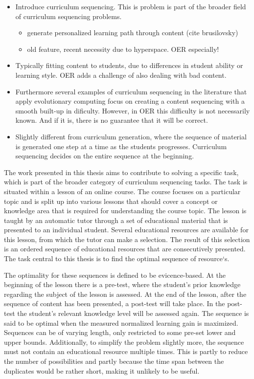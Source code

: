 \begin{itemize}
	\item Introduce curriculum sequencing. This is problem is part of the
		broader field of curriculum sequencing problems.
		\begin{itemize}
			\item generate personalized learning path through content (cite
				brusilovsky)
			\item old feature, recent necessity due to hyperspace. OER
				especially!
		\end{itemize}
	\item Typically fitting content to students, due to differences in student
		ability or learning style. OER adds a challenge of also dealing with
		bad content.
	\item Furthermore several examples of curriculum sequencing in the
		literature that apply evolutionary computing focus on creating a
		content sequencing with a smooth built-up in dificulty. However, in OER
		this difficulty is not necessarily known. And if it is, there is no
		guarantee that it will be correct.
	\item Slightly different from curriculum generation, where the sequence of
		material is generated one step at a time as the students progresses.
		Curriculum sequencing decides on the entire sequence at the beginning.
\end{itemize}


The work presented in this thesis aims to contribute to solving a specific
task, which is part of the broader category of curriculum sequencing tasks.
The task is situated within a lesson of an online course. The course
focuses on a particular topic and is split up into various lessons that should
cover a concept or knowledge area that is required for understanding the
course topic. The lesson is taught by an automatic tutor through a set of
educational material that is presented to an individual student. Several
educational resources are available for this lesson, from which the tutor can
make a selection. The result of this selection is an ordered sequence of
educational resources that are consecutively presented. The task central
to this thesis is to find the optimal sequence of resource`s.

The optimality for these sequences is defined to be evicence-based. At the
beginning of the lesson there is a pre-test, where the student's prior knowledge
regarding the subject of the lesson is assessed. At the end of the lesson,
after the sequence of content has been presented, a post-test will take place.
In the post-test the student's relevant knowledge level will be assessed again.
The sequence is said to be optimal when the measured normalized learning gain
is maximized. Sequences can be of varying length, only restricted to some pre-set
lower and upper bounds. Additionally, to simplify the problem slightly more,
the sequence must not contain an educational resource multiple times. This is
partly to reduce the number of possibilities and partly because the time span
between the duplicates would be rather short, making it unlikely to be useful.

